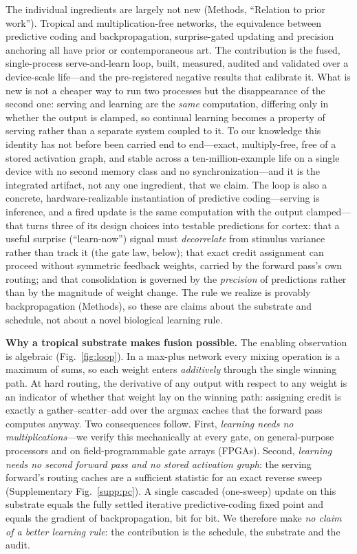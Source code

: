 \documentclass[sn-nature]{sn-jnl}   %
\newcommand{\heading}[1]{\vspace{4pt}\noindent\textbf{#1}\hspace{0.6em}}
\begin{document}
The individual ingredients are largely not new (Methods,
``Relation to prior work''). Tropical and multiplication-free
networks\cite{zhang2018tropical,zhu2024matmulfree,tropicalattention2025,
morpmamba2024}, the equivalence between predictive coding and
backpropagation\cite{rao1999predictive,whittington2017approximation,
song2020can}, surprise-gated updating and precision
anchoring\cite{kirkpatrick2017overcoming} all have prior or contemporaneous
art. The contribution is the fused, single-process serve-and-learn loop,
built, measured, audited and validated over a device-scale life---and the
pre-registered negative results that calibrate it. What is new is not a cheaper
way to run two processes but the disappearance of the second one: serving and
learning are the \emph{same} computation, differing only in whether the output
is clamped, so continual learning becomes a property of serving rather than a
separate system coupled to it. To our knowledge this identity has not before
been carried end to end---exact, multiply-free, free of a stored activation
graph, and stable across a ten-million-example life on a single device with no
second memory class and no synchronization---and it is the integrated artifact,
not any one ingredient, that we claim. The loop is also a concrete,
hardware-realizable instantiation of predictive coding---serving is inference,
and a fired update is the same computation with the output clamped---that turns
three of its design choices into testable predictions for cortex: that a useful
surprise (``learn-now'') signal must \emph{decorrelate} from stimulus variance
rather than track it (the gate law, below); that exact credit assignment can proceed
without symmetric feedback weights, carried by the forward pass's own routing;
and that consolidation is governed by the \emph{precision} of predictions rather
than by the magnitude of weight change. The rule we realize is provably
backpropagation (Methods), so these are claims about the substrate and schedule,
not about a novel biological learning rule.

\heading{Why a tropical substrate makes fusion possible.}
The enabling observation is algebraic (Fig.~\ref{fig:loop}). In a max-plus
network every mixing operation is a maximum of sums, so each weight enters
\emph{additively} through the single winning path. At hard routing, the
derivative of any output with respect to any weight is an indicator of whether
that weight lay on the winning path: assigning credit is exactly a
gather--scatter--add over the argmax caches that the forward pass computes
anyway. Two consequences follow. First, \emph{learning needs no
multiplications}---we verify this mechanically at every gate, on
general-purpose processors and on field-programmable gate arrays (FPGAs).
Second, \emph{learning needs no second forward pass and no stored activation
graph}: the serving forward's routing caches are a sufficient statistic for an
exact reverse sweep (Supplementary Fig.~\ref{supp:pc}). A single cascaded
(one-sweep) update on this substrate
equals the fully settled iterative predictive-coding fixed point and equals the
gradient of backpropagation, bit for bit. We therefore make \emph{no claim of a
better learning rule}: the contribution is the schedule, the substrate and the
audit.
\end{document}
